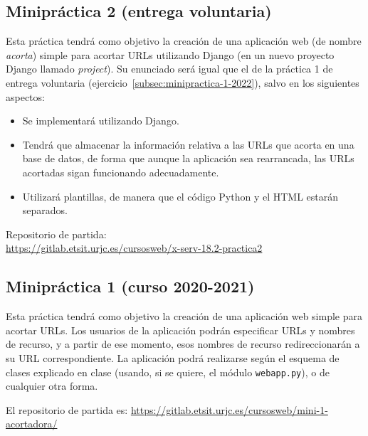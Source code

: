 \subsection{Minipráctica 2 (entrega voluntaria)}
\label{subsec:practica-vol-2-2015}

Esta práctica tendrá como objetivo la creación de una aplicación web (de nombre \emph{acorta}) simple para acortar URLs utilizando Django (en un nuevo proyecto Django llamado \emph{project}). Su enunciado será igual que el de la práctica 1 de entrega voluntaria (ejercicio~\ref{subsec:minipractica-1-2022}), salvo en los siguientes aspectos:

\begin{itemize}
  \item Se implementará utilizando Django.
  \item Tendrá que almacenar la información relativa a las URLs que acorta en una base de datos, de forma que aunque la aplicación sea rearrancada, las URLs acortadas sigan funcionando adecuadamente.
  \item Utilizará plantillas, de manera que el código Python y el HTML estarán separados.
\end{itemize}

Repositorio de partida: \\
\url{https://gitlab.etsit.urjc.es/cursosweb/x-serv-18.2-practica2}

\newpage

\subsection{Minipráctica 1 (curso 2020-2021)}
\label{subsec:practica-vol-1-2016}

Esta práctica tendrá como objetivo la creación de una aplicación web simple para acortar URLs. Los usuarios de la aplicación podrán especificar URLs y nombres de recurso, y a partir de ese momento, esos nombres de recurso redireccionarán a su URL correspondiente. La aplicación podrá realizarse según el esquema de clases explicado en clase (usando, si se quiere, el módulo \texttt{webapp.py}), o de cualquier otra forma.

El repositorio de partida es: \url{https://gitlab.etsit.urjc.es/cursosweb/mini-1-acortadora/}

